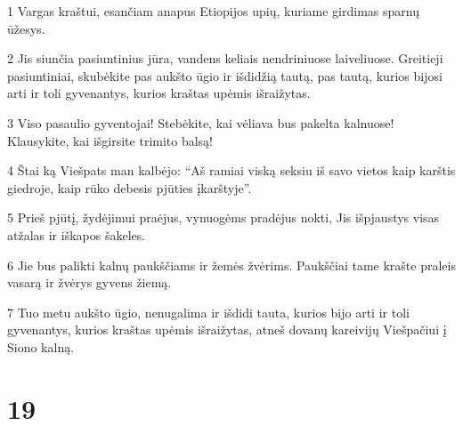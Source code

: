 \par 1 Vargas kraštui, esančiam anapus Etiopijos upių, kuriame girdimas sparnų ūžesys. 
\par 2 Jis siunčia pasiuntinius jūra, vandens keliais nendriniuose laiveliuose. Greitieji pasiuntiniai, skubėkite pas aukšto ūgio ir išdidžią tautą, pas tautą, kurios bijosi arti ir toli gyvenantys, kurios kraštas upėmis išraižytas. 
\par 3 Viso pasaulio gyventojai! Stebėkite, kai vėliava bus pakelta kalnuose! Klausykite, kai išgirsite trimito balsą! 
\par 4 Štai ką Viešpats man kalbėjo: “Aš ramiai viską seksiu iš savo vietos kaip karštis giedroje, kaip rūko debesis pjūties įkarštyje”. 
\par 5 Prieš pjūtį, žydėjimui praėjus, vynuogėms pradėjus nokti, Jis išpjaustys visas atžalas ir iškapos šakeles. 
\par 6 Jie bus palikti kalnų paukščiams ir žemės žvėrims. Paukščiai tame krašte praleis vasarą ir žvėrys gyvens žiemą. 
\par 7 Tuo metu aukšto ūgio, nenugalima ir išdidi tauta, kurios bijo arti ir toli gyvenantys, kurios kraštas upėmis išraižytas, atneš dovanų kareivijų Viešpačiui į Siono kalną.



\chapter{19}


